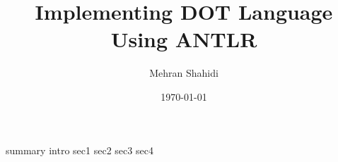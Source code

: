 \documentclass{article}
\title{Implementing DOT Language Using ANTLR}
\author{Mehran Shahidi}
\date{\today}
\begin{document}
\maketitle
{}
{summary}
\newpage
\tableofcontents
\newpage
{}
{intro}
{sec1}
{sec2}
{sec3}
{sec4}
\newpage
\end{document}
